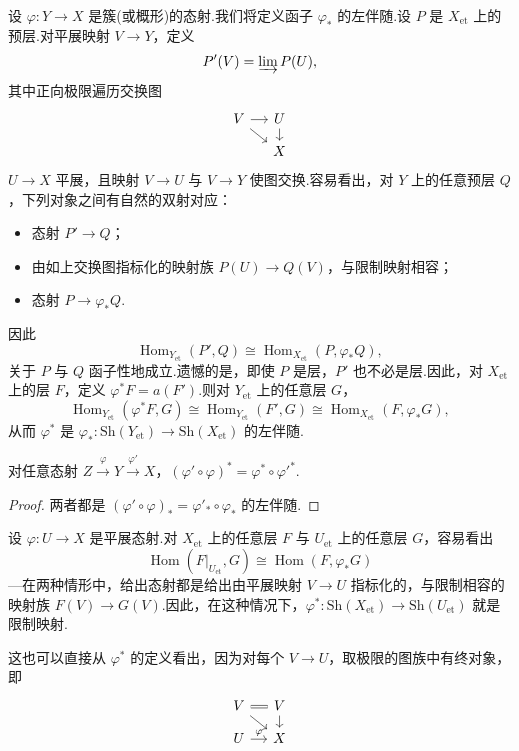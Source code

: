 设 $\varphi \colon Y \to X$ 是簇(或概形)的态射.我们将定义函子 $\varphi_{*}$ 的左伴随.设 $P$ 是 $X_{\mathrm{et}}$ 上的预层.对平展映射 $V \to Y$，定义
\[
P'(V) = \varinjlim P(U),
\]
其中正向极限遍历交换图
\[
\begin{tikzcd}[row sep=small, column sep=small]
  V \arrow[r] \arrow[rd] & U \arrow[d] \\
                         & X
\end{tikzcd}
\]
$U \to X$ 平展，且映射 $V \to U$ 与 $V \to Y$ 使图交换.容易看出，对 $Y$ 上的任意预层 $Q$，下列对象之间有自然的双射对应：
\begin{itemize}
  \item 态射 $P' \to Q$；
  \item 由如上交换图指标化的映射族 $P(U) \to Q(V)$，与限制映射相容；
  \item 态射 $P \to \varphi_{*}Q$.
\end{itemize}
因此
\[
\operatorname{Hom}_{Y_{\mathrm{et}}}(P', Q) \cong \operatorname{Hom}_{X_{\mathrm{et}}}(P, \varphi_{*}Q),
\]
关于 $P$ 与 $Q$ 函子性地成立.遗憾的是，即使 $P$ 是层，$P'$ 也不必是层.因此，对 $X_{\mathrm{et}}$ 上的层 $F$，定义 $\varphi^{*}F = a(F')$.则对 $Y_{\mathrm{et}}$ 上的任意层 $G$，
\[
\operatorname{Hom}_{Y_{\mathrm{et}}}(\varphi^{*}F, G) \cong \operatorname{Hom}_{Y_{\mathrm{et}}}(F', G) \cong \operatorname{Hom}_{X_{\mathrm{et}}}(F, \varphi_{*}G),
\]
从而 $\varphi^{*}$ 是 $\varphi_{*} \colon \mathrm{Sh}(Y_{\mathrm{et}}) \to \mathrm{Sh}(X_{\mathrm{et}})$ 的左伴随.

\begin{proposition}\label{prop:8.7}
对任意态射 $Z \xrightarrow{\varphi} Y \xrightarrow{\varphi'} X$，$(\varphi' \circ \varphi)^{*} = \varphi^{*} \circ \varphi'^{*}$.
\end{proposition}

\begin{proof}
两者都是 $(\varphi' \circ \varphi)_{*} = \varphi'_{*} \circ \varphi_{*}$ 的左伴随.
\end{proof}

\begin{example}\label{ex:8.8}
设 $\varphi \colon U \to X$ 是平展态射.对 $X_{\mathrm{et}}$ 上的任意层 $F$ 与 $U_{\mathrm{et}}$ 上的任意层 $G$，容易看出
\[
\operatorname{Hom}(F|_{U_{\mathrm{et}}}, G) \cong \operatorname{Hom}(F, \varphi_{*}G)
\]
---在两种情形中，给出态射都是给出由平展映射 $V \to U$ 指标化的，与限制相容的映射族 $F(V) \to G(V)$.因此，在这种情况下，$\varphi^{*} \colon \mathrm{Sh}(X_{\mathrm{et}}) \to \mathrm{Sh}(U_{\mathrm{et}})$ 就是限制映射.

这也可以直接从 $\varphi^{*}$ 的定义看出，因为对每个 $V \to U$，取极限的图族中有终对象，即
\[
\begin{tikzcd}[row sep=small, column sep=small]
  V \arrow[r, equal] \arrow[rd] & V \arrow[d] \\
  U \arrow[r, "\varphi"] & X
\end{tikzcd}
\]
\end{example}

